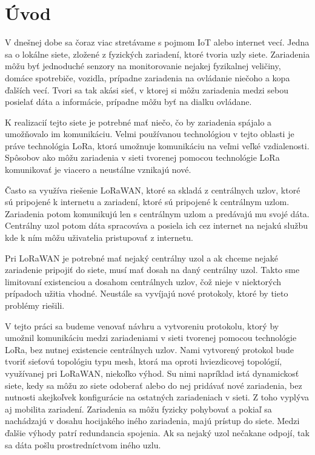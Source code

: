 \documentclass[slovak,master]{diploma}
\begin{document}
\MakeTitlePages

\listoffigures
\clearpage

\listoftables
\clearpage

\chapter{Úvod}
V dnešnej dobe sa čoraz viac stretávame s pojmom IoT alebo internet vecí. Jedna sa o lokálne siete, zložené z fyzických zariadení, ktoré tvoria uzly siete.
Zariadenia môžu byť jednoduché senzory na monitorovanie nejakej fyzikalnej veličiny, domáce spotrebiče, vozidla, prípadne 
zariadenia na ovládanie niečoho a kopa ďalších vecí. Tvori sa tak akási sieť, v ktorej si môžu zariadenia medzi sebou posielať 
dáta a informácie, prípadne môžu byť na dialku ovládane.

K realizacií tejto siete je potrebné mať niečo, čo by zariadenia spájalo a umožňovalo im komunikáciu. Velmi používanou technológiou
v tejto oblasti je práve technológia LoRa, ktorá umožnuje komunikáciu na veľmi veľké vzdialenosti. Spôsobov ako môžu zariadenia 
v sieti tvorenej pomocou technológie LoRa komunikovať je viacero a neustálne vznikajú nové. %

Často sa využíva riešenie LoRaWAN, ktoré sa skladá z centrálnych uzlov, ktoré sú pripojené k internetu a zariadení, ktoré sú pripojené k centrálnym uzlom. 
Zariadenia potom komunikujú len s centrálnym uzlom a predávajú mu svojé dáta. Centrálny uzol potom dáta spracováva a posiela ich cez internet na nejakú službu kde 
k ním môžu uživatelia pristupovať z internetu.

Pri LoRaWAN je potrebné mať nejaký centrálny uzol a ak chceme nejaké zariadenie pripojiť do siete, musí mať dosah na daný centrálny uzol. 
Takto sme limitovaní existenciou a dosahom centrálnych uzlov, čož nieje v niektorých prípadoch užitia vhodné. Neustále sa vyvíjajú nové 
protokoly, ktoré by tieto problémy riešili. %

V tejto práci sa budeme venovať návhru a vytvoreniu protokolu, ktorý by umožnil komunikáciu medzi zariadeniami v sieti tvorenej pomocou technológie LoRa,
bez nutnej existencie centrálnych uzlov. Nami vytvorený protokol bude tvoriť sieťovú topológiu typu mesh, ktorá ma oproti hviezdicovej topológií, 
využívanej pri LoRaWAN, niekoľko výhod. Su nimi napríklad istá dynamickosť siete, kedy sa môžu zo siete odoberať alebo do nej pridávať nové zariadenia, 
bez nutnosti akejkoľvek konfigurácie na ostatných zariadeniach v sieti. Z toho vyplýva aj mobilita zariadení. Zariadenia sa môžu fyzicky pohybovať a 
pokiaľ sa nachádzajú v dosahu hocijakého iného zariadenia, majú prístup do siete. Medzi ďalšie výhody patrí redundancia spojenia. Ak sa nejaký 
uzol nečakane odpojí, tak sa dáta pošlu prostredníctvom iného uzlu.
\end{document}
